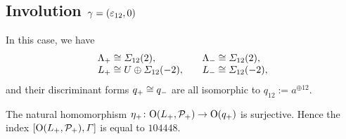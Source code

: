 \documentclass{amsart} %
\begin{document}
\subsection{Involution $\gamma=(\varepsilon_{12}, 0)$}\label{subsec:walls12}
%
%
In this case, we have
\[
\begin{array}{ll}
\Lambda_{+}\cong \varSigma_{12}(2), \quad &\Lambda_{-}\cong \varSigma_{12}(2),\\
L_{+}\cong U\oplus \varSigma_{12}(-2), \quad &L_{-}\cong \varSigma_{12}(-2), 
\end{array}
\]
and their discriminant forms $q_{+}\cong q_{-}$ are all isomorphic to
$q_{12}:=a^{\oplus 12}$.
%
%
%
% 
%
%
\begin{proposition}
The natural homomorphism 
${\eta}_{+}\colon \mathord{\mathrm{O}}(L_{+}, \mathord{\mathcal{P}}_{+}) \to \mathord{\mathrm{O}}(q_{+})$ is surjective.
Hence the index 
$[\mathord{\mathrm{O}}(L_{+}, \mathord{\mathcal{P}}_{+}), \varGamma]$ is equal to 
$104448$.
\end{proposition}
%
\end{document}
